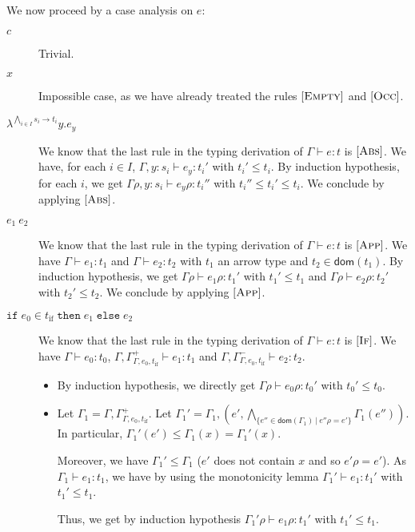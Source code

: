 \documentclass[a4paper]{article}%
\newcommand{\dom}[1]{\textsf{dom}(#1)}
\newcommand{\alt}{~|~}
\newcommand{\ite}[4]{\ensuremath{\texttt{if}\;#1\in#2\;\texttt{then}\;#3\;\texttt{else}\;#4}}
\theoremstyle{definition}
\newcommand {\Rule}[1] {[\textsc{#1}]}
\begin{document}
    We now proceed by a case analysis on $e$:
    
    \begin{description}
      \item[$c$] Trivial.
      \item[$x$] Impossible case, as we have already treated the rules $\Rule{Empty}$ and $\Rule{Occ}$.
      \item[$\lambda^{\bigwedge_{i\in I} s_i \rightarrow t_i}y.e_y$]
      We know that the last rule in the typing derivation of $\Gamma \vdash e:t$ is $\Rule {Abs}$.
      We have, for each $i \in I$, $\Gamma,y:s_i \vdash e_y:t_i'$ with $t_i'\leq t_i$.
      By induction hypothesis, for each $i$, we get  $\Gamma\rho,y:s_i \vdash e_y\rho:t_i''$ with $t_i''\leq t_i'\leq t_i$. We conclude by applying $\Rule {Abs}$.
      \item[$e_1\ e_2$] We know that the last rule in the typing derivation of $\Gamma \vdash e:t$ is $\Rule {App}$.
      We have $\Gamma\vdash e_1:t_1$ and $\Gamma\vdash e_2:t_2$ with $t_1$ an arrow type and $t_2 \in \dom {t_1}$.
      By induction hypothesis, we get $\Gamma\rho\vdash e_1\rho:t_1'$ with $t_1' \leq t_1$ and $\Gamma\rho\vdash e_2\rho:t_2'$ with $t_2' \leq t_2$. We conclude by applying $\Rule {App}$.
      \item[$\ite {e_0} {t_{\text{if}}} {e_1}{e_2}$] We know that the last rule in the typing derivation of $\Gamma \vdash e:t$ is $\Rule {If}$.
      We have $\Gamma\vdash e_0:t_0$, $\Gamma,\Gamma^+_{\Gamma,e_0,t_{\text{if}}}\vdash e_1 : t_1$ and $\Gamma,\Gamma^-_{\Gamma,e_0,t_{\text{if}}}\vdash e_2 : t_2$.
      \begin{itemize}
        \item By induction hypothesis, we directly get $\Gamma\rho\vdash e_0\rho:t_0'$ with $t_0'\leq t_0$.
        \item Let $\Gamma_1 = \Gamma,\Gamma^+_{\Gamma,e_0,t_{\text{if}}}$. Let $\Gamma_1'=\Gamma_1,(e',\bigwedge_{\{e''\in \dom {\Gamma_1}\alt e''\rho=e'\}} \Gamma_1(e''))$.
        In particular, $\Gamma_1'(e')\leq\Gamma_1(x)=\Gamma_1'(x)$.
        
        Moreover, we have $\Gamma_1' \leq \Gamma_1$ ($e'$ does not contain $x$ and so $e'\rho=e'$).
        As $\Gamma_1 \vdash e_1:t_1$, we have by using the monotonicity lemma $\Gamma_1' \vdash e_1:t_1'$ with $t_1'\leq t_1$.

        Thus, we get by induction hypothesis $\Gamma_1'\rho\vdash e_1\rho:t_1'$ with $t_1' \leq t_1$.


\end{itemize}
\end{description}
\end{document}

